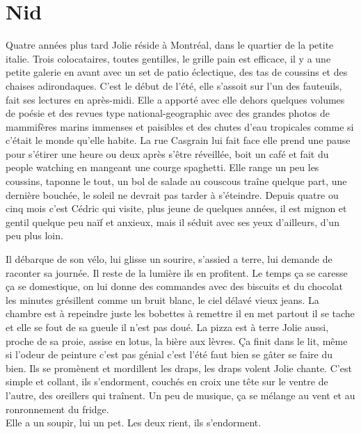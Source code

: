 \clearpage
\section*{Nid}
Quatre années plus tard Jolie réside à Montréal, dans le quartier de la petite
italie. Trois colocataires, toutes gentilles, le grille pain est efficace, il y
a une petite galerie en avant avec un set de patio éclectique, des tas de
coussins et des chaises adirondaques. C’est le début de l’été, elle s’assoit
sur l’un des fauteuils, fait ses lectures en après-midi. Elle a apporté avec
elle dehors quelques volumes de poésie et des revues type national-geographic
avec des grandes photos de mammifères marins immenses et paisibles et des
chutes d’eau tropicales comme si c’était le monde qu’elle habite.  La rue
Casgrain lui fait face elle prend une pause pour s’étirer une heure ou deux
après s’être réveillée, boit un café et fait du people watching en mangeant une
courge spaghetti. Elle range un peu les coussins, taponne le tout, un bol de
salade au couscous traîne quelque part, une dernière bouchée, le soleil ne
devrait pas tarder à s’éteindre. Depuis quatre ou cinq mois c’est Cédric qui
visite, plus jeune de quelques années, il est mignon et gentil quelque peu naïf
et anxieux, mais il séduit avec ses yeux d’ailleurs, d’un peu plus loin.

Il débarque de son vélo, lui glisse un sourire, s’assied a terre, lui demande
de raconter sa journée. Il reste de la lumière ils en profitent. Le temps ça se
caresse ça se domestique, on lui donne des commandes avec des biscuits et du
chocolat les minutes grésillent comme un bruit blanc, le ciel délavé vieux
jeans. La chambre est à repeindre juste les bobettes à remettre il en met
partout il se tache et elle se fout de sa gueule il n’est pas doué. La pizza
est à terre Jolie aussi, proche de sa proie, assise en lotus, la bière aux
lèvres.  Ça finit dans le lit, même si l’odeur de peinture c’est pas génial
c’est l’été faut bien se gâter se faire du bien. Ils se promènent et mordillent
les draps, les draps volent Jolie chante. C’est simple et collant, ils
s’endorment, couchés en croix une tête sur le ventre de l’autre, des oreillers
qui traînent. Un peu de musique, ça se mélange au vent et au ronronnement du
fridge.\\

Elle a un soupir, lui un pet. Les deux rient, ils s’endorment.\\


